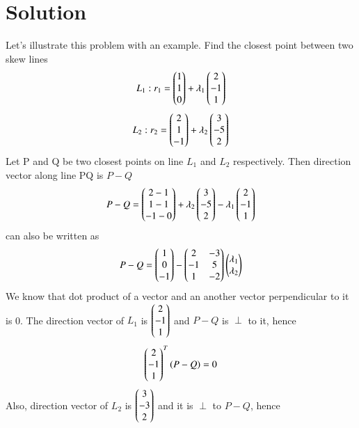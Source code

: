 \documentclass[journal,12pt,twocolumn]{IEEEtran}
\begin{document}
\section{Solution}
Let's illustrate this problem with an example. Find the closest point between two skew lines
\begin{equation}\label{eq4}
    L_1: r_1 = \begin{pmatrix}1\\1\\0\end{pmatrix} + \lambda{_1}\begin{pmatrix}2\\-1\\1\end{pmatrix}
\end{equation}
\begin{equation}\label{eq5}
    L_2: r_2 = \begin{pmatrix}2\\1\\-1\end{pmatrix} + \lambda{_2}\begin{pmatrix}3\\-5\\2\end{pmatrix}
\end{equation}
Let P and Q be two closest points on line $L_1$ and $L_2$ respectively. Then direction vector along line PQ is $P - Q$
\begin{equation}
    P - Q = \begin{pmatrix}2-1\\1-1\\-1-0\end{pmatrix} + \lambda{_2}\begin{pmatrix}3\\-5\\2\end{pmatrix} - \lambda{_1}\begin{pmatrix}2\\-1\\1\end{pmatrix}
\end{equation}
can also be written as
\begin{equation}\label{eq10}
    P - Q = \begin{pmatrix}1\\0\\-1\end{pmatrix} - \begin{pmatrix}2 & -3\\-1 & 5\\1 & -2\end{pmatrix}\begin{pmatrix}\lambda{_1}\\\lambda{_2}\end{pmatrix}
\end{equation}
We know that dot product of a vector and an another vector perpendicular to it is 0. The direction vector of $L_1$ is $\begin{pmatrix}2\\-1\\1\end{pmatrix}$ and $P - Q$ is $\perp$ to it, hence
\begin{equation}\label{eq11}
    \begin{pmatrix}2\\-1\\1\end{pmatrix}^T\left(P - Q\right) = 0
\end{equation}
Also, direction vector of $L_2$ is $\begin{pmatrix}3\\-3\\2\end{pmatrix}$ and it is $\perp$ to $P - Q$, hence
\end{document}
